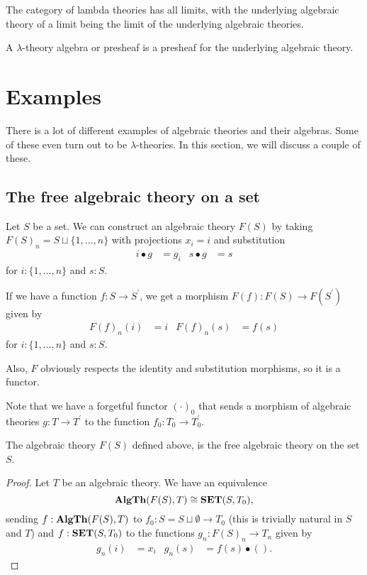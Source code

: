 \begin{remark}
  The category of lambda theories has all limits, with the underlying algebraic theory of a limit being the limit of the underlying algebraic theories.
\end{remark}

A $ \lambda $-theory algebra or presheaf is a presheaf for the underlying algebraic theory.

\section{Examples}

There is a lot of different examples of algebraic theories and their algebras. Some of these even turn out to be $ \lambda $-theories. In this section, we will discuss a couple of these.

\subsection{The free algebraic theory on a set}
\begin{example}
  Let $ S $ be a set. We can construct an algebraic theory $ F(S) $ by taking $ F(S)_n = S \sqcup \{ 1, \dots, n \} $ with projections $ x_i = i $ and substitution
  \begin{align*}
    i \bullet g &= g_i & s \bullet g &= s
  \end{align*}
  for $ i : \{ 1, \dots, n \} $ and $ s : S $.

  If we have a function $ f: S \to S^\prime $, we get a morphism $ F(f): F(S) \to F(S^\prime) $ given by
  \begin{align*}
    F(f)_n(i) &= i & F(f)_n(s) &= f(s)
  \end{align*}
  for $ i : \{ 1, \dots, n \} $ and $ s : S $.

  Also, $ F $ obviously respects the identity and substitution morphisms, so it is a functor.
\end{example}

Note that we have a forgetful functor $ (\cdot)_0 $ that sends a morphism of algebraic theories $ g: T \to T^\prime $ to the function $ f_0: T_0 \to T^\prime_0 $.

\begin{lemma}
  The algebraic theory $ F(S) $ defined above, is the free algebraic theory on the set $ S $.
\end{lemma}
\begin{proof}
  Let $ T $ be an algebraic theory. We have an equivalence
  \[ \mathbf{AlgTh}(F(S), T) \cong \mathbf{SET}(S, T_0), \]
  sending $ f: \mathbf{AlgTh}(F(S), T) $ to $ f_0: S = S \sqcup \emptyset \to T_0 $ (this is trivially natural in $ S $ and $ T $) and $ f: \mathbf{SET}(S, T_0) $ to the functions $ g_n: F(S)_n \to T_n $ given by
  \begin{align*}
    g_n(i) &= x_i & g_n(s) &= f(s) \bullet ().
  \end{align*}
\end{proof}

